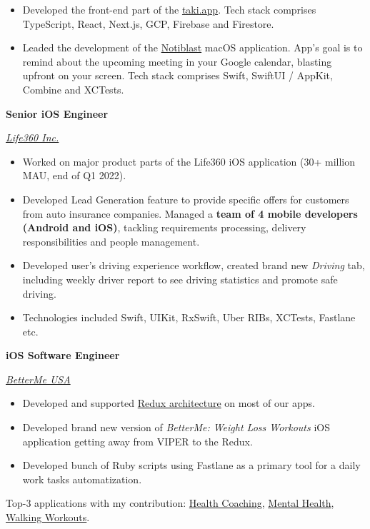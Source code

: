 \documentclass[12pt]{article}
\newcommand{\SubSectionSpacing}{
    \vspace*{0.5em}
}
\newcommand{\Experience}[3]{%
    \noindent \textbf{#1}
    \hfill \text{#2} \par
    \noindent \textit{#3} \par
    \normalsize \normalfont \par
}
\begin{document}
\noindent
\begin{itemize}[label=-]
    \setlength\itemsep{0em}
    \item Developed the front-end part of the \href{https://taki.app}{taki.app}. 
    Tech stack comprises TypeScript, React, Next.js, GCP, Firebase and Firestore.
    \item Leaded the development of the \href{https://apps.apple.com/in/app/notiblast/id6443910263}{Notiblast} macOS application.
    App's goal is to remind about the upcoming meeting in your Google calendar, blasting upfront on your screen.
    Tech stack comprises Swift, SwiftUI / AppKit, Combine and XCTests.
\end{itemize}

\SubSectionSpacing

\Experience
{Senior iOS Engineer}
{Jan 2020--Apr 2022}
{\href{https://www.life360.com}{Life360 Inc.}}

\noindent
\begin{itemize}[label=-]
    \setlength\itemsep{0em}
    \item Worked on major product parts of the Life360 iOS application (30+ million MAU, end of Q1 2022). 
    \item Developed Lead Generation feature to provide specific offers for customers from auto insurance companies. 
    Managed a \textbf{team of 4 mobile developers (Android and iOS)}, tackling requirements processing, delivery responsibilities and people management. 
    \item Developed user's driving experience workflow, created brand new \textit{Driving} tab, including weekly driver report to see driving statistics and promote safe driving.
    \item Technologies included Swift, UIKit, RxSwift, Uber RIBs, XCTests, Fastlane etc.
\end{itemize}

\SubSectionSpacing

\Experience
{iOS Software Engineer}
{Nov 2018 -- Dec 2019}
{\href{https://betterme.world/about}{BetterMe USA}}

\noindent
\begin{itemize}[label=-]
    \setlength\itemsep{0em}
    \item Developed and supported \href{https://www.raywenderlich.com/books/advanced-ios-app-architecture/v3.0/chapters/6-architecture-redux}{Redux architecture} on most of our apps. 
    \item Developed brand new version of \textit{BetterMe: Weight Loss Workouts} iOS application getting away from VIPER to the Redux. 
    \item Developed bunch of Ruby scripts using Fastlane as a primary tool for a daily work tasks automatization.
\end{itemize}
\newline \noindent
Top-3 applications with my contribution: 
\href{https://apps.apple.com/us/app/betterme-weight-loss-workouts/id1264546236}{Health Coaching}, 
\href{https://apps.apple.com/us/app/betterme-calm-sleep-meditate/id1363010081}{Mental Health}, 
\href{https://apps.apple.com/us/app/betterme-walking-weightloss/id1434400695}{Walking Workouts}.
\end{document}
